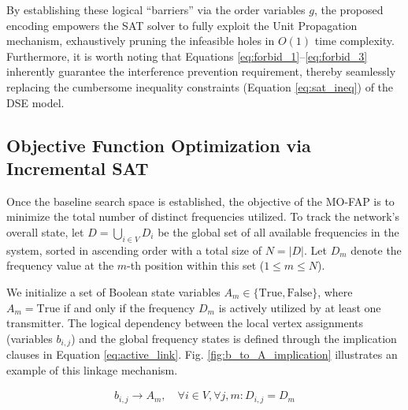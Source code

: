 \documentclass[letterpaper,journal]{IEEEtran}
\begin{document}
By establishing these logical ``barriers'' via the order variables $g$, the proposed encoding empowers the SAT solver to fully exploit the Unit Propagation mechanism, exhaustively pruning the infeasible holes in $O(1)$ time complexity. Furthermore, it is worth noting that Equations \eqref{eq:forbid_1}--\eqref{eq:forbid_3} inherently guarantee the interference prevention requirement, thereby seamlessly replacing the cumbersome inequality constraints (Equation \eqref{eq:sat_ineq}) of the DSE model.


\subsection{Objective Function Optimization via Incremental SAT}
\label{subsec:incremental_sat}

Once the baseline search space is established, the objective of the MO-FAP is to minimize the total number of distinct frequencies utilized. To track the network's overall state, let $D = \bigcup_{i \in V} D_i$ be the global set of all available frequencies in the system, sorted in ascending order with a total size of $N = |D|$. Let $D_{m}$ denote the frequency value at the $m$-th position within this set ($1 \le m \le N$).

We initialize a set of Boolean state variables $A_{m} \in \{\text{True}, \text{False}\}$, where $A_{m} = \text{True}$ if and only if the frequency $D_{m}$ is actively utilized by at least one transmitter. The logical dependency between the local vertex assignments (variables $b_{i,j}$) and the global frequency states is defined through the implication clauses in Equation \eqref{eq:active_link}. Fig. \ref{fig:b_to_A_implication} illustrates an example of this linkage mechanism.

\begin{align}
    b_{i,j} \rightarrow A_{m}, \quad \forall i \in V, \forall j, m : D_{i,j} = D_{m} \label{eq:active_link}
\end{align}
\end{document}
